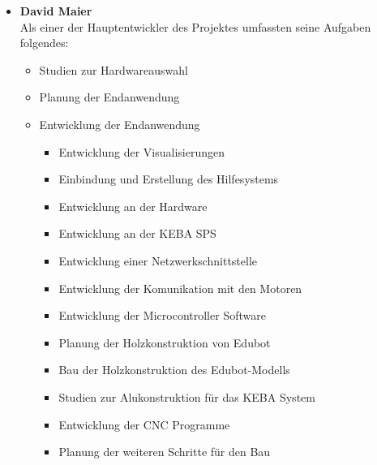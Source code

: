 \begin{itemize}
\item \textbf{David Maier}\\
Als einer der Hauptentwickler des Projektes umfassten seine Aufgaben folgendes:
\begin{itemize}
\item Studien zur Hardwareauswahl
\item Planung der Endanwendung
\item Entwicklung der Endanwendung
\begin{itemize}
\item Entwicklung der Visualisierungen
\item Einbindung und Erstellung des Hilfesystems
\end{itemize}
\begin{itemize}
\item Entwicklung an der Hardware
\end{itemize}
\begin{itemize}
\item Entwicklung an der KEBA SPS
\item Entwicklung einer Netzwerkschnittstelle 
\item Entwicklung der Komunikation mit den Motoren
\item Entwicklung der Microcontroller Software
\item Planung der Holzkonstruktion von Edubot
\item Bau der Holzkonstruktion des Edubot-Modells
\item Studien zur Alukonstruktion für das KEBA System
\item Entwicklung der CNC Programme
\item Planung der weiteren Schritte für den Bau
\end{itemize}
\end{itemize}




\end{itemize}
